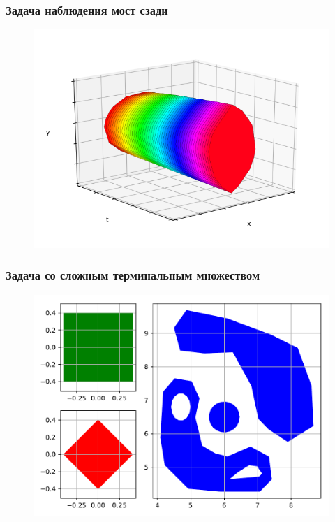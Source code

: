 \documentclass{beamer}
\begin{document}

  \begin{frame}
    \frametitle{Задача наблюдения мост сзади}

    \begin{figure}
        \includegraphics[width=\linewidth,height=0.8\textheight,keepaspectratio]{example2_bridge_back}
    \end{figure} 

  \end{frame}



  \begin{frame}
    \frametitle{Задача со сложным терминальным множеством}

    \begin{figure}
        \includegraphics[width=\linewidth,height=0.8\textheight,keepaspectratio]{example3_pqm}
    \end{figure}

  \end{frame}  
\end{document}
